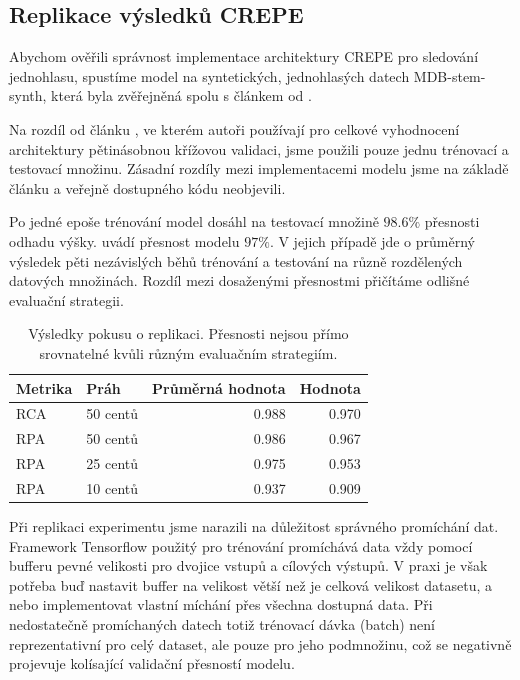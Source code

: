 \subsection{Replikace výsledků CREPE}

Abychom ověřili správnost implementace architektury CREPE pro sledování jednohlasu, spustíme model na syntetických, jednohlasých datech MDB-stem-synth, která byla zvěřejněná spolu s článkem od \cite{Salamon2017}.

Na rozdíl od článku \cite{Kim2018}, ve kterém autoři používají pro celkové vyhodnocení architektury pětinásobnou křížovou validaci, jsme použili pouze jednu trénovací a testovací množinu. Zásadní rozdíly mezi implementacemi modelu jsme na základě článku a veřejně dostupného kódu neobjevili.

Po jedné epoše trénování model dosáhl na testovací množině $98.6\%$ přesnosti odhadu výšky. \cite{Kim2018} uvádí přesnost modelu $97\%$. V jejich případě jde o průměrný výsledek pěti nezávislých běhů trénování a testování na různě rozdělených datových množinách. Rozdíl mezi dosaženými přesnostmi přičítáme odlišné evaluační strategii.

\begin{table}[h!]

\centering
    \begin{tabular}{llrr}
    \toprule
    Metrika & Práh & Průměrná hodnota & Hodnota \cite{Kim2018} \\
    \midrule
    RCA & 50 centů & 0.988 & 0.970 \\
    RPA  & 50 centů & 0.986 & 0.967 \\
    RPA  & 25 centů & 0.975 & 0.953 \\
    RPA  & 10 centů & 0.937 & 0.909 \\
    \bottomrule
    \end{tabular}
\caption{Výsledky pokusu o replikaci. Přesnosti nejsou přímo srovnatelné kvůli různým evaluačním strategiím.}\label{tab:crepe_dimensions}

\end{table}

Při replikaci experimentu jsme narazili na důležitost správného promíchání dat. Framework Tensorflow použitý pro trénování promíchává data vždy pomocí bufferu pevné velikosti pro dvojice vstupů a cílových výstupů. V praxi je však potřeba buď nastavit buffer na velikost větší než je celková velikost datasetu, a nebo implementovat vlastní míchání přes všechna dostupná data. Při nedostatečně promíchaných datech totiž trénovací dávka (batch) není reprezentativní pro celý dataset, ale pouze pro jeho podmnožinu, což se negativně projevuje kolísající validační přesností modelu.

